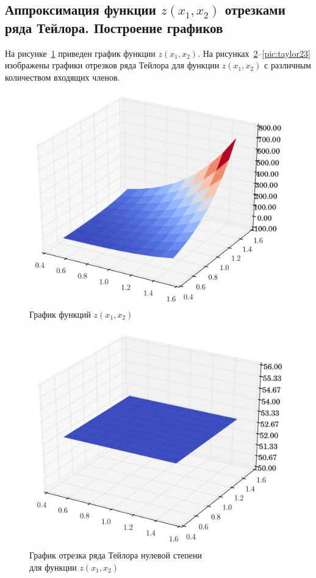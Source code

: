 \newpage


\subsection{Аппроксимация функции $z (x_1, x_2)$ отрезками ряда Тейлора.
  Построение графиков}

На рисунке~\ref{pic:real2} приведен график функции $z (x_1, x_2)$.
На рисунках~\ref{pic:taylor20}--\ref{pic:taylor23} изображены графики
отрезков ряда Тейлора для функции $z (x_1, x_2)$ с различным количеством
входящих членов.

\begin{figure}[h!]
  \centering
  \includegraphics[width=0.55\linewidth]{pic/real_2}
  \caption{График функций $z(x_1, x_2)$}
  \label{pic:real2}
\end{figure}

\begin{figure}[h!]
  \centering
  \includegraphics[width=0.55\linewidth]{pic/taylor_2_0}
  \caption{График отрезка ряда Тейлора нулевой степени \\ для функции $z(x_1, x_2)$}
  \label{pic:taylor20}
\end{figure}

\newpage

